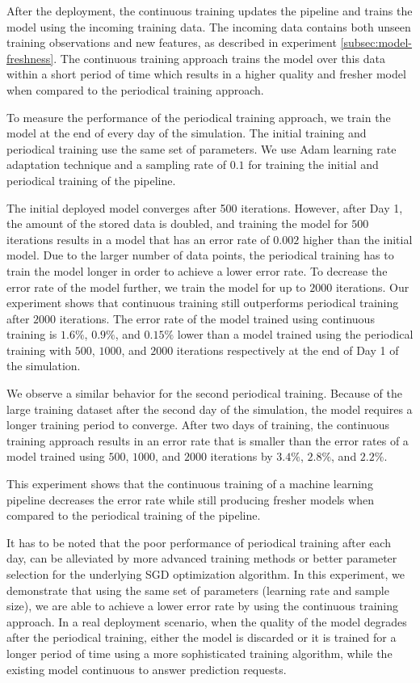 After the deployment, the continuous training updates the pipeline and trains the model using the incoming training data.
The incoming data contains both unseen training observations and new features, as described in experiment \ref{subsec:model-freshness}.
The continuous training approach trains the model over this data within a short period of time which results in a higher quality and fresher model when compared to the periodical training approach.

To measure the performance of the periodical training approach, we train the model at the end of every day of the simulation.
The initial training and periodical training use the same set of parameters.
We use Adam learning rate adaptation technique and a sampling rate of $0.1$ for training the initial and periodical training of the pipeline.

The initial deployed model converges after 500 iterations.
However, after Day 1, the amount of the stored data is doubled, and training the model for $500$ iterations results in a model that has an error rate of $0.002$ higher than the initial model.
Due to the larger number of data points, the periodical training has to train the model longer in order to achieve a lower error rate.
To decrease the error rate of the model further, we train the model for up to $2000$ iterations.
Our experiment shows that continuous training still outperforms periodical training after $2000$ iterations.
The error rate of the model trained using continuous training is $1.6\%$, $0.9\%$, and $0.15\% $ lower than a model trained using the periodical training with $500$, $1000$, and $2000$ iterations respectively at the end of Day 1 of the simulation.

We observe a similar behavior for the second periodical training.
Because of the large training dataset after the second day of the simulation, the model requires a longer training period to converge.
After two days of training, the continuous training approach results in an error rate that is smaller than the error rates of a model trained using $500$, $1000$, and $2000$ iterations by $3.4\%$, $2.8\%$, and $2.2\%$.

This experiment shows that the continuous training of a machine learning pipeline decreases the error rate while still producing fresher models when compared to the periodical training of the pipeline.

It has to be noted that the poor performance of periodical training after each day, can be alleviated by more advanced training methods or better parameter selection for the underlying SGD optimization algorithm.
In this experiment, we demonstrate that using the same set of parameters (learning rate and sample size), we are able to achieve a lower error rate by using the continuous training approach.
In a real deployment scenario, when the quality of the model degrades after the periodical training, either the model is discarded or it is trained for a longer period of time using a more sophisticated training algorithm, while the existing model continuous to answer prediction requests.


